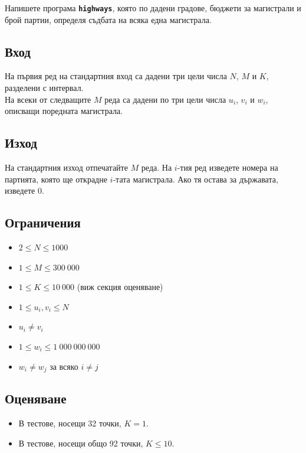 \documentclass[12pt]{article}
\begin{document}
	Напишете програма \texttt{\textbf{highways}}, която по дадени градове, бюджети за магистрали и брой партии, определя съдбата на всяка една магистрала.
	
	\subsection{Вход}
	На първия ред на стандартния вход са дадени три цели числа $N$, $M$ и $K$, разделени с интервал.\\
	На всеки от следващите $M$ реда са дадени по три цели числа $u_i$, $v_i$ и $w_i$, описващи поредната магистрала.
	
	\subsection{Изход}
	На стандартния изход отпечатайте $M$ реда. На $i$-тия ред изведете номера на партията, която ще открадне $i$-тата магистрала. Ако тя остава за държавата, изведете $0$.
	
	\subsection{Ограничения}
	\vspace{0.1em}
	\begin{itemize}
		\item $2 \leq N \leq 1000$
		\item $1 \leq M \leq 300\ 000$
		\item $1 \leq K \leq 10\ 000$ (виж секция оценяване)
		\item $1 \leq u_i, v_i \leq N$
		\item $u_i \neq v_i$
		\item $1 \leq w_i \leq 1\ 000\ 000\ 000$
		\item $w_i \neq w_j$ за всяко $i \neq j$
	\end{itemize}
	
	\subsection{Оценяване}
	\begin{itemize}
	    \item В тестове, носещи 32 точки, $K=1$.
	    \item В тестове, носещи общо 92 точки, $K \leq 10$.
	\end{itemize}
	
\end{document}
